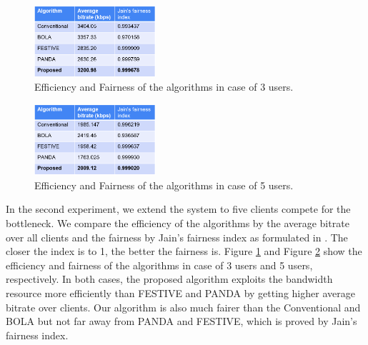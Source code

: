 \documentclass[journal]{IEEEtran}
\begin{document}
\begin{figure}[!h]
	\centering
	
	\includegraphics[width=0.4\textwidth]{images/Sum 3.png}
	
	
	
	\caption{Efficiency and Fairness of the algorithms in case of 3 users.}
	\label {Sum 3}
	
\end{figure} 
\begin{figure}[!h]
	\centering
	
	\includegraphics[width=0.4\textwidth]{images/Sum 5.png}
	
	
	
	\caption{Efficiency and Fairness of the algorithms in case of 5 users.}
	\label {Sum 5}
	
\end{figure} 
\par In the second experiment, we extend the system to five clients compete for the bottleneck. We compare the efficiency of the algorithms by the average bitrate over all clients and the fairness by Jain's fairness index as formulated in \cite{JainFair}. The closer the index is to 1, the better the fairness is. Figure \ref{Sum 3} and Figure \ref{Sum 5} show the efficiency and fairness of the algorithms in case of 3 users and 5 users, respectively. In both cases, the proposed algorithm exploits the bandwidth resource more efficiently than FESTIVE and PANDA by getting higher average bitrate over clients. Our algorithm is also much fairer than the Conventional and BOLA but not far away from PANDA and FESTIVE, which is proved by Jain's fairness index.
\end{document}
